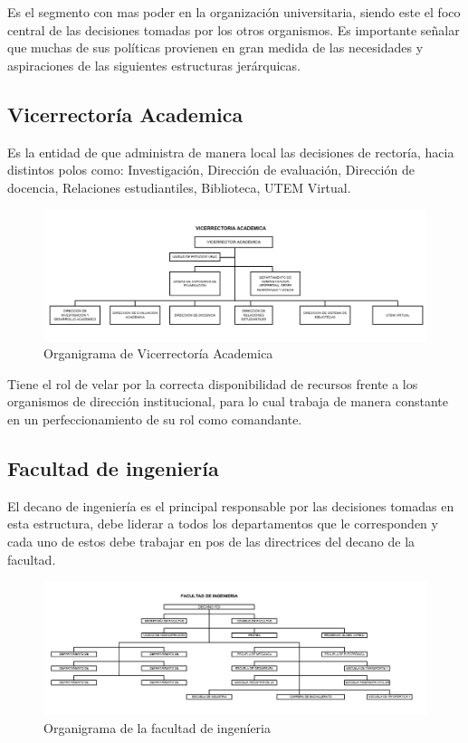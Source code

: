 \documentclass[a4paper,12pt,openany,oneside]{book}
\begin{document}
Es el segmento con mas poder en la organización universitaria, siendo este el foco central de las decisiones tomadas por los otros organismos. Es importante señalar que muchas de sus políticas provienen en gran medida de las necesidades y aspiraciones de las siguientes estructuras jerárquicas.

\subsection{Vicerrectoría Academica}
Es la entidad de que administra de manera local las decisiones de rectoría, hacia distintos polos como: Investigación, Dirección de evaluación, Dirección de docencia, Relaciones estudiantiles, Biblioteca, UTEM Virtual.
\begin{figure}[!hbp]
\begin{center}
\includegraphics[scale=0.45,angle=0]{images/organigrama/2.png}
\caption{Organigrama de Vicerrector\'ia Academica}
\label{Organigrama de vicerrectoria Academica}
\end{center}
\end{figure}

Tiene el rol de velar por la correcta disponibilidad de recursos frente a los organismos de dirección institucional, para lo cual trabaja de manera constante en un perfeccionamiento de su rol como comandante.

\subsection{Facultad de ingeniería}
El decano de ingeniería es el principal responsable por las decisiones tomadas en esta estructura, debe liderar a todos los departamentos que le corresponden y cada uno de estos debe trabajar en pos de las directrices del decano de la facultad.
\begin{figure}[!hbp]
\begin{center}
\includegraphics[scale=0.45,angle=0]{images/organigrama/11.png}
\caption{Organigrama de la facultad de ingen\'ieria}
\label{Organigrama de la facultad de ingenieria}
\end{center}
\end{figure}
\end{document}
